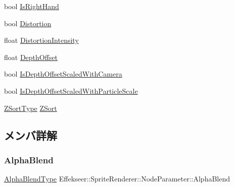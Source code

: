 \begin{DoxyCompactItemize}
\item 
bool \mbox{\hyperlink{struct_effekseer_1_1_sprite_renderer_1_1_node_parameter_a14d8e403ed9cc3ec7bb7f7e6a88595a1}{Is\+Right\+Hand}}
\item 
bool \mbox{\hyperlink{struct_effekseer_1_1_sprite_renderer_1_1_node_parameter_aae6a39601c61032914529de573cb5e32}{Distortion}}
\item 
float \mbox{\hyperlink{struct_effekseer_1_1_sprite_renderer_1_1_node_parameter_aab3176045ff052d13ab49a55edb9bb74}{Distortion\+Intensity}}
\item 
float \mbox{\hyperlink{struct_effekseer_1_1_sprite_renderer_1_1_node_parameter_a84a2261f63b8e81c72969ee5c0a5b2c8}{Depth\+Offset}}
\item 
bool \mbox{\hyperlink{struct_effekseer_1_1_sprite_renderer_1_1_node_parameter_a9df806e7ba3cb6d5da9399a03a7864af}{Is\+Depth\+Offset\+Scaled\+With\+Camera}}
\item 
bool \mbox{\hyperlink{struct_effekseer_1_1_sprite_renderer_1_1_node_parameter_a090334edbb3bc3fa04ff63f0443679f7}{Is\+Depth\+Offset\+Scaled\+With\+Particle\+Scale}}
\item 
\mbox{\hyperlink{namespace_effekseer_a7a8ec04f4de0308b5fdb7d66675bddaf}{Z\+Sort\+Type}} \mbox{\hyperlink{struct_effekseer_1_1_sprite_renderer_1_1_node_parameter_ac565028a6b9d045e4220676ef2e4e0d0}{Z\+Sort}}
\end{DoxyCompactItemize}


\subsection{メンバ詳解}
\mbox{\label{struct_effekseer_1_1_sprite_renderer_1_1_node_parameter_a1b14867e8d71ab1836d732866df2c973}} 
\subsubsection{\texorpdfstring{Alpha\+Blend}{AlphaBlend}}
{\footnotesize\ttfamily \mbox{\hyperlink{namespace_effekseer_a8c32fd5b7ec7feed73314b2ae8086949}{Alpha\+Blend\+Type}} Effekseer\+::\+Sprite\+Renderer\+::\+Node\+Parameter\+::\+Alpha\+Blend}

